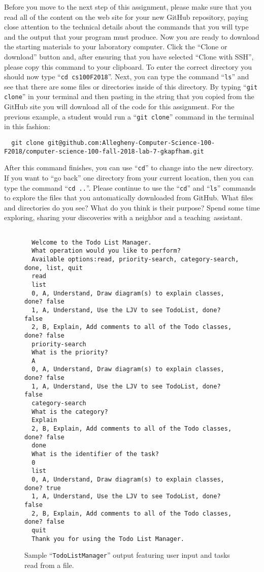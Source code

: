 \documentclass[11pt]{article}
\newcommand{\command}[1]{``\lstinline{#1}''}
\newcommand{\step}[1]{``{#1}''}
\begin{document}
Before you move to the next step of this assignment, please make sure that you
read all of the content on the web site for your new GitHub repository, paying
close attention to the technical details about the commands that you will type
and the output that your program must produce. Now you are ready to download the
starting materials to your laboratory computer. Click the ``Clone or download''
button and, after ensuring that you have selected ``Clone with SSH'', please
copy this command to your clipboard. To enter the correct directory you should
now type \command{cd cs100F2018}. Next, you can type the command \command{ls}
and see that there are some files or directories inside of this directory. By
typing \command{git clone} in your terminal and then pasting in the string that
you copied from the GitHub site you will download all of the code for this
assignment. For the previous example, a student would run a \command{git clone}
command in the terminal in this fashion:

\begin{lstlisting}
  git clone git@github.com:Allegheny-Computer-Science-100-F2018/computer-science-100-fall-2018-lab-7-gkapfham.git
\end{lstlisting}

After this command finishes, you can use \command{cd} to change into the new
directory. If you want to \step{go back} one directory from your current
location, then you can type the command \command{cd ..}. Please continue to use
the \command{cd} and \command{ls} commands to explore the files that you
automatically downloaded from GitHub. What files and directories do you see?
What do you think is their purpose? Spend some time exploring, sharing your
discoveries with a neighbor and a \mbox{teaching assistant}.

\begin{figure}[tb]
  \begin{Verbatim}[commandchars=\\\{\}]

  Welcome to the Todo List Manager.
  What operation would you like to perform?
  Available options:read, priority-search, category-search, done, list, quit
  read
  list
  0, A, Understand, Draw diagram(s) to explain classes, done? false
  1, A, Understand, Use the LJV to see TodoList, done? false
  2, B, Explain, Add comments to all of the Todo classes, done? false
  priority-search
  What is the priority?
  A
  0, A, Understand, Draw diagram(s) to explain classes, done? false
  1, A, Understand, Use the LJV to see TodoList, done? false
  category-search
  What is the category?
  Explain
  2, B, Explain, Add comments to all of the Todo classes, done? false
  done
  What is the identifier of the task?
  0
  list
  0, A, Understand, Draw diagram(s) to explain classes, done? true
  1, A, Understand, Use the LJV to see TodoList, done? false
  2, B, Explain, Add comments to all of the Todo classes, done? false
  quit
  Thank you for using the Todo List Manager.
\end{Verbatim}
\vspace*{-.1in}
\caption{Sample ``{\tt TodoListManager}'' output featuring user input and tasks read from a file.}
\label{fig:output}
\end{figure}
\end{document}
